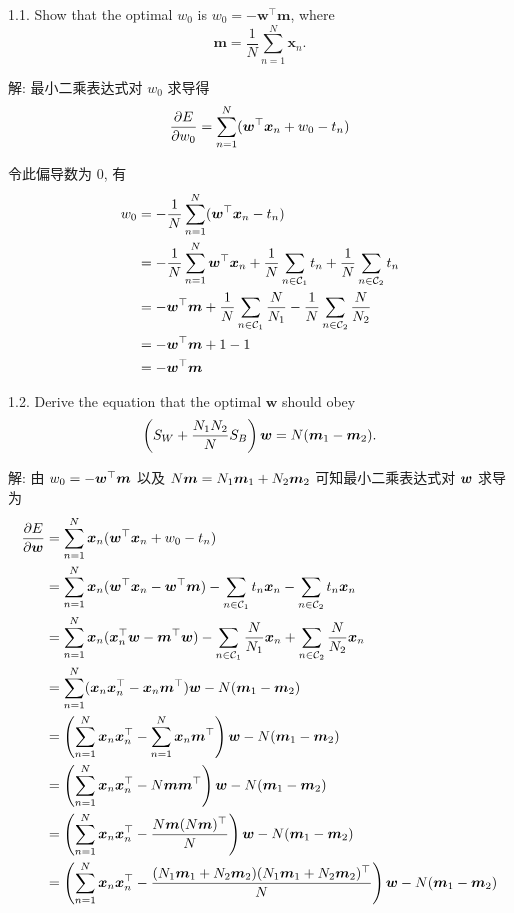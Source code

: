 \documentclass{article}
\begin{document}
1.1. Show that the optimal $w_{0}$ is $w_{0}=-\bm{w}^{\top}\bm{m}$, where
\begin{equation}
  \bm{m}= \frac{1}{N}\sum_{n=1}^{N}{\bm{x}_{n}}.
\end{equation}

解: 最小二乘表达式对 $w_0$ 求导得
\begin{equation}
  \frac{\partial E}{\partial w_0}=\sum_{n=1}^{N}(\bm{w}^{\top}\bm{x}_{n}+w_{0}-t_{n})
\end{equation}

令此偏导数为 0, 有
\begin{equation}
  \begin{aligned}
    w_0
    &=-\frac{1}{N}\sum_{n=1}^{N}(\bm{w}^{\top}\bm{x}_{n}-t_{n})\\
    &=-\frac{1}{N}\sum_{n=1}^{N}\bm{w}^{\top}\bm{x}_{n}+\frac{1}{N}\sum_{n\in \mathcal{C}_{1}}t_n+\frac{1}{N}\sum_{n\in \mathcal{C}_{2}}t_n\\
    &=-\bm{w}^{\top}\bm{m}+\frac{1}{N}\sum_{n\in \mathcal{C}_{1}}\frac{N}{N_1}-\frac{1}{N}\sum_{n\in \mathcal{C}_{2}}\frac{N}{N_2}\\
    &=-\bm{w}^{\top}\bm{m}+1-1\\
    &=-\bm{w}^{\top}\bm{m}\\
  \end{aligned}
\end{equation}

1.2. Derive the equation that the optimal $\bm{w}$ should obey
\begin{equation}
  \left(S_{W}+\frac{N_{1}N_{2}}{N}S_{B}\right)\bm{w}=N(\bm{m}_1-\bm{m}_2).
  \label{eq:1}
\end{equation}

解: 由 $w_0=-\bm{w}^{\top}\bm{m}$ 以及 $N\bm{m}=N_1\bm{m}_1+N_2\bm{m}_2$ 可知最小二乘表达式对 $\bm{w}$ 求导为
\begin{equation}
  \begin{aligned}
    \frac{\partial E}{\partial \bm{w}}
    &=\sum_{n=1}^{N}\bm{x}_n(\bm{w}^{\top}\bm{x}_{n}+w_{0}-t_{n})\\
    &=\sum_{n=1}^{N}\bm{x}_n(\bm{w}^{\top}\bm{x}_{n}-\bm{w}^{\top}\bm{m})-\sum_{n\in \mathcal{C}_{1}}t_{n}\bm{x}_n-\sum_{n\in \mathcal{C}_{2}}t_{n}\bm{x}_n\\
    &=\sum_{n=1}^{N}\bm{x}_n(\bm{x}_n^{\top}\bm{w}-\bm{m}^{\top}\bm{w})-\sum_{n\in \mathcal{C}_{1}}\frac{N}{N_1}\bm{x}_n+\sum_{n\in \mathcal{C}_{2}}\frac{N}{N_2}\bm{x}_n\\
    &=\sum_{n=1}^{N}(\bm{x}_n\bm{x}_n^{\top}-\bm{x}_n\bm{m}^{\top})\bm{w}-N(\bm{m}_1-\bm{m}_2)\\
    &=\left(\sum_{n=1}^{N}\bm{x}_n\bm{x}_n^{\top}-\sum_{n=1}^{N}\bm{x}_n\bm{m}^{\top}\right)\bm{w}-N(\bm{m}_1-\bm{m}_2)\\
    &=\left(\sum_{n=1}^{N}\bm{x}_n\bm{x}_n^{\top}-N\bm{m}\bm{m}^{\top}\right)\bm{w}-N(\bm{m}_1-\bm{m}_2)\\
    &=\left(\sum_{n=1}^{N}\bm{x}_n\bm{x}_n^{\top}-\frac{N\bm{m} (N\bm{m})^{\top}}{N}\right)\bm{w}-N(\bm{m}_1-\bm{m}_2)\\
    &=\left(\sum_{n=1}^{N}\bm{x}_n\bm{x}_n^{\top}-\frac{(N_1\bm{m}_1+N_2\bm{m}_2) (N_1\bm{m}_1+N_2\bm{m}_2)^{\top}}{N}\right)\bm{w}-N(\bm{m}_1-\bm{m}_2)\\
  \end{aligned}
\end{equation}
\end{document}
